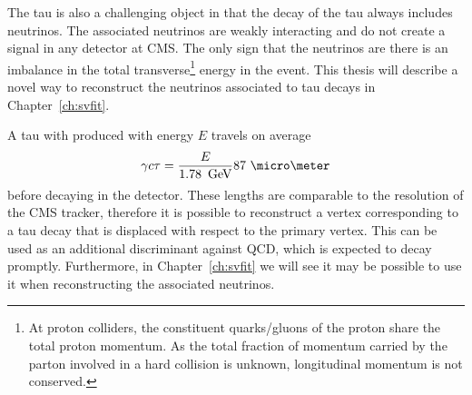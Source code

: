The tau is also a challenging object in that the decay of the tau always
includes neutrinos.  The associated neutrinos are weakly interacting and do not
create a signal in any detector at CMS\@.  The only sign that the neutrinos are
there is an imbalance in the total transverse\footnote{At proton colliders, the
constituent quarks/gluons of the proton share the total proton momentum.  As the
total fraction of momentum carried by the parton involved in a hard collision is
unknown, longitudinal momentum is not conserved.} energy in the event.  This
thesis will describe a novel way to reconstruct the neutrinos associated to tau
decays in Chapter~\ref{ch:svfit}.  

A tau with produced with energy $E$ travels on average 
\begin{equation}
  \gamma c \tau = \frac{E}{1.78~\GeV} 87~\micro\meter \nonumber
\end{equation}
before decaying in the detector.  These lengths are comparable to the resolution
of the CMS tracker, therefore it is possible to reconstruct a vertex
corresponding to a tau decay that is displaced with respect to the primary
vertex.  This can be used as an additional discriminant against QCD, which is
expected to decay promptly.  Furthermore, in Chapter~\ref{ch:svfit} we will see
it may be possible to use it when reconstructing the associated neutrinos.

\ifx\master\undefined\fi
